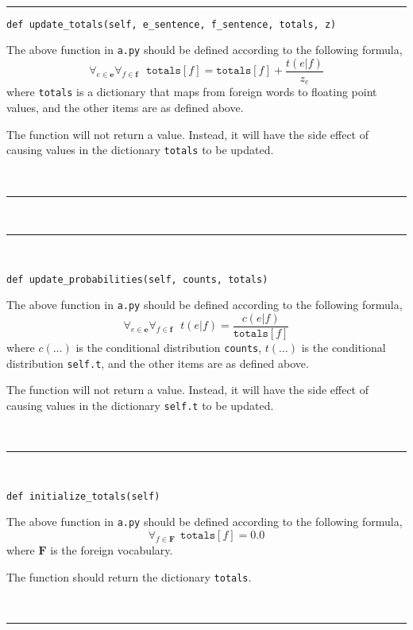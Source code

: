 \documentclass[]{article}
\begin{document}
\ \\
\noindent\rule[0.5ex]{\linewidth}{1pt}


\begin{verbatim}
def update_totals(self, e_sentence, f_sentence, totals, z)
\end{verbatim}

The above function in \texttt{a.py} should be defined according to the following formula,
%
\begin{equation}
\forall_{e \in \bm{e}} \forall_{f \in \bm{f}} \ \ \ \texttt{totals}[f] = \texttt{totals}[f] + \frac{t(e|f)}{z_e}
\end{equation}
%
where \texttt{totals} is a dictionary that maps from foreign words to floating point values, and the other items are as defined above.

The function will not return a value. Instead, it will have the side effect of causing values in the dictionary \texttt{totals} to be updated.

\ \\
\noindent\rule[0.5ex]{\linewidth}{1pt}

\newpage


\ \\
\noindent\rule[0.5ex]{\linewidth}{1pt}
\ \\

\begin{verbatim}
def update_probabilities(self, counts, totals)
\end{verbatim}

The above function in \texttt{a.py} should be defined according to the following formula,
%
\begin{equation}
\forall_{e \in \bm{e}} \forall_{f \in \bm{f}} \ \ \ t(e|f) = \frac{c(e|f)}{\texttt{totals}[f]}\end{equation}
%
where $c(\ldots)$ is the conditional distribution \texttt{counts}, $t(\ldots)$ is the conditional distribution \texttt{self.t}, and the other items are as defined above.

The function will not return a value. Instead, it will have the side effect of causing values in the dictionary \texttt{self.t} to be updated.

\ \\
\noindent\rule[0.5ex]{\linewidth}{1pt}
\ \\

\begin{verbatim}
def initialize_totals(self)
\end{verbatim}

The above function in \texttt{a.py} should be defined according to the following formula,
%
\begin{equation}
\forall_{f \in {\bm F}} \ \ {\texttt{totals}[f]} = 0.0
\end{equation}
%
where ${\bm F}$ is the foreign vocabulary.

The function should return the dictionary \texttt{totals}.

\ \\
\noindent\rule[0.5ex]{\linewidth}{1pt}
\ \\
\end{document}
